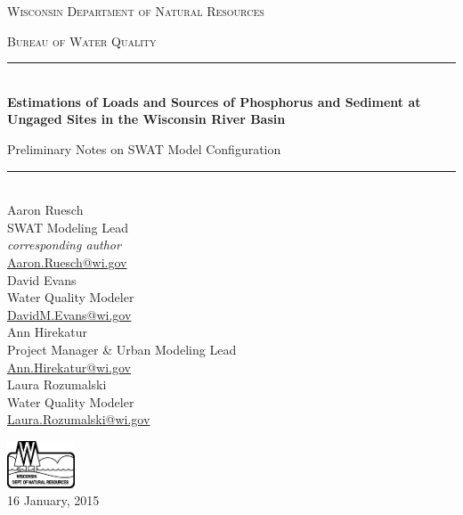\begin{titlepage}
\begin{center}
	\bigskip
	\textsc{ \Large  Wisconsin Department of Natural Resources}\par
	\medskip
	\textsc{ \Large Bureau of Water Quality}\par
	\bigskip
	\rule{\linewidth}{0.5mm} \\[0.4cm]
	\textbf{\Large Estimations of Loads and Sources of Phosphorus and Sediment at Ungaged Sites in the Wisconsin River Basin}\par
	\medskip
	{\Large Preliminary Notes on SWAT Model Configuration}\par
	\rule{\linewidth}{0.5mm} \\[0.4cm]
	\bigskip
	\noindent
	Aaron Ruesch \\
	SWAT Modeling Lead \\
	\textit{corresponding author} \\
	\href{mailto:Aaron.Ruesch@wi.gov}{Aaron.Ruesch@wi.gov} \\
	\medskip
	David Evans \\
	Water Quality Modeler \\
	\href{mailto:DavidM.Evans@wi.gov}{DavidM.Evans@wi.gov} \\
	\medskip
	Ann Hirekatur \\
	Project Manager \& Urban Modeling Lead \\
	\href{mailto:Ann.Hirekatur@wi.gov}{Ann.Hirekatur@wi.gov} \\
	\medskip
	Laura Rozumalski \\
	Water Quality Modeler \\
	\href{mailto:Laura.Rozumalski@wi.gov}{Laura.Rozumalski@wi.gov} \\

	\vfill
	
	\includegraphics[width=0.15\textwidth]{./img/DNR2.eps} \\
	\medskip
	{\large 16 January, 2015}
	
\end{center}
\end{titlepage}
